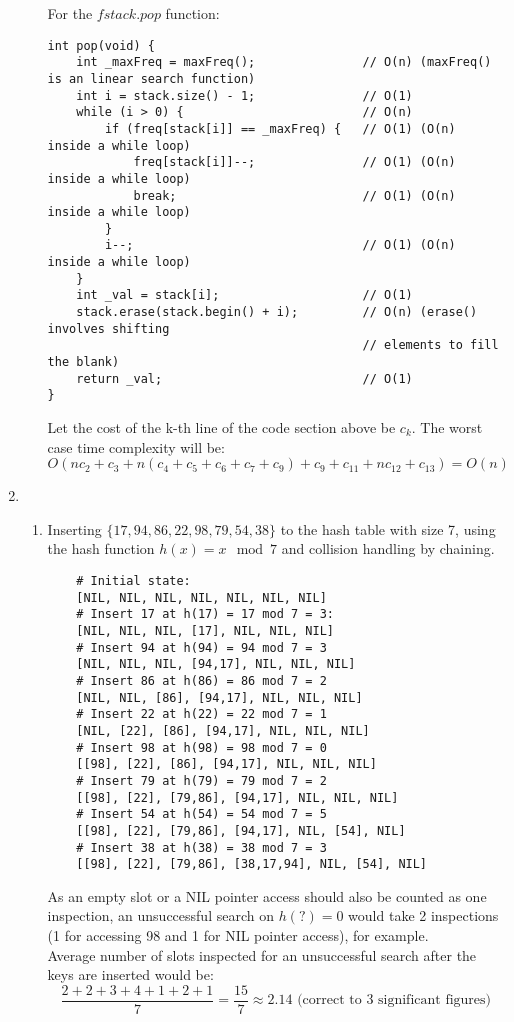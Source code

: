 \documentclass{article}
\begin{document}
\begin{enumerate}
\begin{enumerate}[label=(\alph*)]
        For the $fstack.pop$ function:
        \begin{verbatim}
int pop(void) {
    int _maxFreq = maxFreq();               // O(n) (maxFreq() is an linear search function)
    int i = stack.size() - 1;               // O(1)
    while (i > 0) {                         // O(n)
        if (freq[stack[i]] == _maxFreq) {   // O(1) (O(n) inside a while loop)
            freq[stack[i]]--;               // O(1) (O(n) inside a while loop)
            break;                          // O(1) (O(n) inside a while loop)
        }
        i--;                                // O(1) (O(n) inside a while loop)
    }
    int _val = stack[i];                    // O(1)
    stack.erase(stack.begin() + i);         // O(n) (erase() involves shifting
                                            // elements to fill the blank)
    return _val;                            // O(1)
}
        \end{verbatim}
        Let the cost of the k-th line of the code section above be $c_k$. The worst case time complexity will be:
        \[
        O(nc_2+c_3+n(c_4+c_5+c_6+c_7+c_9)+c_9+c_{11}+nc_{12}+c_{13}) = O(n)
        \]
    \end{enumerate}

\item
    \begin{enumerate}[label=(\alph*)]
        \item Inserting $\{17,94,86,22,98,79,54,38\}$ to the hash table with size 7, using the hash function $h(x) = x \mod 7$ and collision handling by chaining.
        \begin{verbatim}
    # Initial state:
    [NIL, NIL, NIL, NIL, NIL, NIL, NIL]
    # Insert 17 at h(17) = 17 mod 7 = 3:
    [NIL, NIL, NIL, [17], NIL, NIL, NIL]
    # Insert 94 at h(94) = 94 mod 7 = 3
    [NIL, NIL, NIL, [94,17], NIL, NIL, NIL]
    # Insert 86 at h(86) = 86 mod 7 = 2
    [NIL, NIL, [86], [94,17], NIL, NIL, NIL]
    # Insert 22 at h(22) = 22 mod 7 = 1
    [NIL, [22], [86], [94,17], NIL, NIL, NIL]
    # Insert 98 at h(98) = 98 mod 7 = 0
    [[98], [22], [86], [94,17], NIL, NIL, NIL]
    # Insert 79 at h(79) = 79 mod 7 = 2
    [[98], [22], [79,86], [94,17], NIL, NIL, NIL]
    # Insert 54 at h(54) = 54 mod 7 = 5
    [[98], [22], [79,86], [94,17], NIL, [54], NIL]
    # Insert 38 at h(38) = 38 mod 7 = 3
    [[98], [22], [79,86], [38,17,94], NIL, [54], NIL]
        \end{verbatim}
        As an empty slot or a NIL pointer access should also be counted as one inspection, an unsuccessful search on $h(?) = 0$ would take 2 inspections (1 for accessing 98 and 1 for NIL pointer access), for example. \\
        Average number of slots inspected for an unsuccessful search after the keys are inserted would be:
        \[
        \frac{2+2+3+4+1+2+1}{7} = \frac{15}{7} \approx 2.14 \text{ (correct to 3 significant figures)}
        \]


\end{enumerate}
\end{enumerate}
\end{document}
